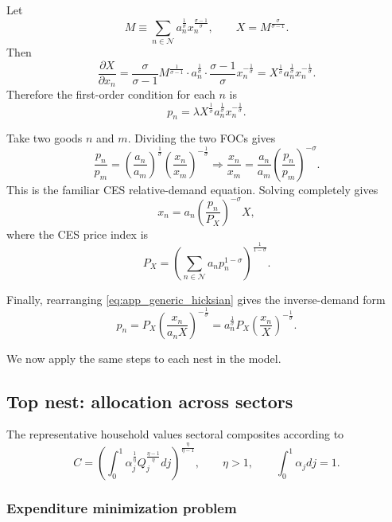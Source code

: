 Let
\[
M \equiv \sum_{n \in \mathcal{N}} a_n^{\frac{1}{\sigma}} x_n^{\frac{\sigma-1}{\sigma}},
\qquad
X = M^{\frac{\sigma}{\sigma-1}}.
\]
Then
\[
\frac{\partial X}{\partial x_n}
=
\frac{\sigma}{\sigma-1}
M^{\frac{1}{\sigma-1}}
\cdot
a_n^{\frac{1}{\sigma}}
\cdot
\frac{\sigma-1}{\sigma} x_n^{-\frac{1}{\sigma}}
=
X^{\frac{1}{\sigma}} a_n^{\frac{1}{\sigma}} x_n^{-\frac{1}{\sigma}}.
\]
Therefore the first-order condition for each $n$ is
\begin{equation}
p_n = \lambda X^{\frac{1}{\sigma}} a_n^{\frac{1}{\sigma}} x_n^{-\frac{1}{\sigma}}.
\label{eq:app_generic_ces_foc}
\end{equation}

Take two goods $n$ and $m$. Dividing the two FOCs gives
\[
\frac{p_n}{p_m}
=
\left( \frac{a_n}{a_m} \right)^{\frac{1}{\sigma}}
\left( \frac{x_n}{x_m} \right)^{-\frac{1}{\sigma}}
\Longrightarrow
\frac{x_n}{x_m}
=
\frac{a_n}{a_m}
\left( \frac{p_n}{p_m} \right)^{-\sigma}.
\]
This is the familiar CES relative-demand equation. Solving completely gives
\begin{equation}
x_n = a_n \left( \frac{p_n}{P_X} \right)^{-\sigma} X,
\label{eq:app_generic_hicksian}
\end{equation}
where the CES price index is
\begin{equation}
P_X =
\left(
\sum_{n \in \mathcal{N}}
a_n p_n^{1-\sigma}
\right)^{\frac{1}{1-\sigma}}.
\label{eq:app_generic_price_index}
\end{equation}

Finally, rearranging \eqref{eq:app_generic_hicksian} gives the inverse-demand form
\begin{equation}
p_n
=
P_X
\left( \frac{x_n}{a_n X} \right)^{-\frac{1}{\sigma}}
=
a_n^{\frac{1}{\sigma}} P_X \left( \frac{x_n}{X} \right)^{-\frac{1}{\sigma}}.
\label{eq:app_generic_inverse_demand}
\end{equation}

We now apply the same steps to each nest in the model.

\subsection{Top nest: allocation across sectors}

The representative household values sectoral composites according to
\[
C =
\left(
\int_0^1
\alpha_j^{\frac{1}{\eta}} Q_j^{\frac{\eta-1}{\eta}} dj
\right)^{\frac{\eta}{\eta-1}},
\qquad
\eta > 1,
\qquad
\int_0^1 \alpha_j dj = 1.
\]

\subsubsection{Expenditure minimization problem}

